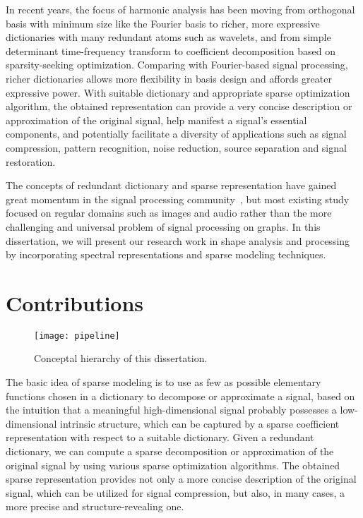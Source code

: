 In recent years, the focus of harmonic analysis has been moving from orthogonal 
basis with minimum size like the Fourier basis to richer, more expressive 
dictionaries with many redundant atoms such as wavelets, and from simple 
determinant time-frequency transform to coefficient decomposition based on 
sparsity-seeking optimization. Comparing with Fourier-based signal processing,
richer dictionaries allows more flexibility in basis design and affords greater 
expressive power. With suitable dictionary and appropriate sparse optimization 
algorithm, the obtained representation can provide a very concise description or 
approximation of the original signal, help manifest a signal's essential 
components, and potentially facilitate a diversity of applications such as signal 
compression, pattern recognition, noise reduction, source separation and signal 
restoration.

The concepts of redundant dictionary and sparse representation have gained great momentum
in the signal processing community~\cite{Mallat2008}, but most existing study focused on 
regular domains such as images and audio rather than the more challenging and universal 
problem of signal processing on graphs. In this dissertation, we will present our research 
work in shape analysis and processing by incorporating spectral representations and sparse 
modeling techniques.

\section{Contributions}

\begin{figure}
  \centering
  \texttt{[image: pipeline]}
  \caption[Hierarchy of this dissertation]
  {Conceptal hierarchy of this dissertation.}
  \label{fig:thesis_hierarchy}
\end{figure}

The basic idea of sparse modeling is to use as few as possible elementary functions chosen
in a dictionary to decompose or approximate a signal, based on the intuition that a meaningful
high-dimensional signal probably possesses a low-dimensional intrinsic structure, which can be
captured by a sparse coefficient representation with respect to a suitable dictionary. Given a
redundant dictionary, we can compute a sparse decomposition or approximation of the original signal
by using various sparse optimization algorithms. The obtained sparse representation provides not
only a more concise description of the original signal, which can be utilized for signal compression,
but also, in many cases, a more precise and structure-revealing one.


